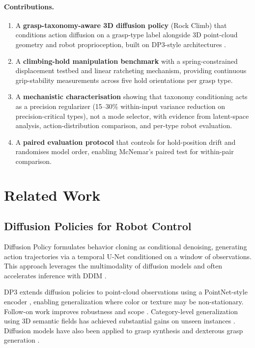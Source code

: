 \documentclass[11pt]{article}
\begin{document}
\paragraph{Contributions.}
\begin{enumerate}
  \item A \textbf{grasp-taxonomy-aware 3D diffusion policy} (Rock Climb) that
    conditions action diffusion on a grasp-type label alongside 3D point-cloud
    geometry and robot proprioception, built on DP3-style architectures
    \citep{ze2024dp3}.
  \item A \textbf{climbing-hold manipulation benchmark} with a spring-constrained
    displacement testbed and linear ratcheting mechanism, providing continuous
    grip-stability measurements across five hold orientations per grasp type.
  \item A \textbf{mechanistic characterisation} showing that taxonomy conditioning
    acts as a precision regularizer (15--30\% within-input variance reduction on
    precision-critical types), not a mode selector, with evidence from latent-space
    analysis, action-distribution comparison, and per-type robot evaluation.
  \item A \textbf{paired evaluation protocol} that controls for hold-position drift
    and randomises model order, enabling McNemar's paired test for within-pair
    comparison.
\end{enumerate}

\section{Related Work}
\subsection{Diffusion Policies for Robot Control}
Diffusion Policy \citep{chi2023diffusionpolicy} formulates behavior cloning as
conditional denoising, generating action trajectories via a temporal U-Net conditioned
on a window of observations. This approach leverages the multimodality of diffusion
models \citep{ho2020ddpm} and often accelerates inference with DDIM \citep{song2021ddim}.

DP3 \citep{ze2024dp3} extends diffusion policies to point-cloud observations using a
PointNet-style encoder \citep{qi2017pointnet}, enabling generalization where color or
texture may be non-stationary. Follow-on work improves robustness and scope
\citep{ze2024idp3}. Category-level generalization using 3D semantic fields has achieved
substantial gains on unseen instances \citep{wang2024gendp}. Diffusion models have also
been applied to grasp synthesis and dexterous grasp generation \citep{weng2024dexdiffuser}.
\end{document}
